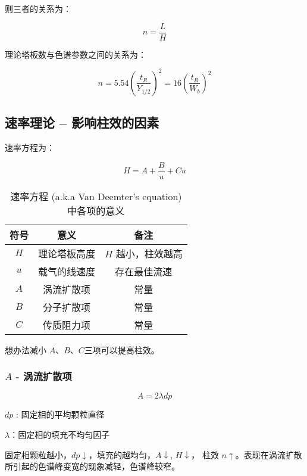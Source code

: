 则三者的关系为：

\begin{equation}
    n = \frac{L}{H}
\end{equation}

理论塔板数与色谱参数之间的关系为：

\begin{equation}
    n = 5.54 \left( \frac{t_R}{Y_{1/2}} \right)^2 = 16 \left(\frac{t_R}{W_b}\right)^2
\end{equation}

\subsection{速率理论 -- 影响柱效的因素}

速率方程为：

\begin{equation}
    H = A + \frac{B}{u} + C u
\end{equation}

\begin{table}[H]
    \caption{速率方程 (a.k.a Van Deemter's equation) 中各项的意义}
    \centering
    \begin{tabular}{ccc}
        \toprule
        符号  & 意义     & 备注          \\
        \midrule
        $H$ & 理论塔板高度 & $H$ 越小，柱效越高 \\
        $u$ & 载气的线速度 & 存在最佳流速      \\
        $A$ & 涡流扩散项  & 常量          \\
        $B$ & 分子扩散项  & 常量          \\
        $C$ & 传质阻力项  & 常量          \\
        \bottomrule
    \end{tabular}
\end{table}


想办法减小 $A$、$B$、$C$三项可以提高柱效。

\subsubsection{$A$ - 涡流扩散项}

\begin{equation}
    A = 2 \lambda d p
\end{equation}

$d p$ : 固定相的平均颗粒直径

$\lambda$：固定相的填充不均匀因子

固定相颗粒越小，$d p \downarrow$，填充的越均匀，$A \downarrow$, $H \downarrow$，
柱效 $n \uparrow$。表现在涡流扩散所引起的色谱峰变宽的现象减轻，色谱峰较窄。

